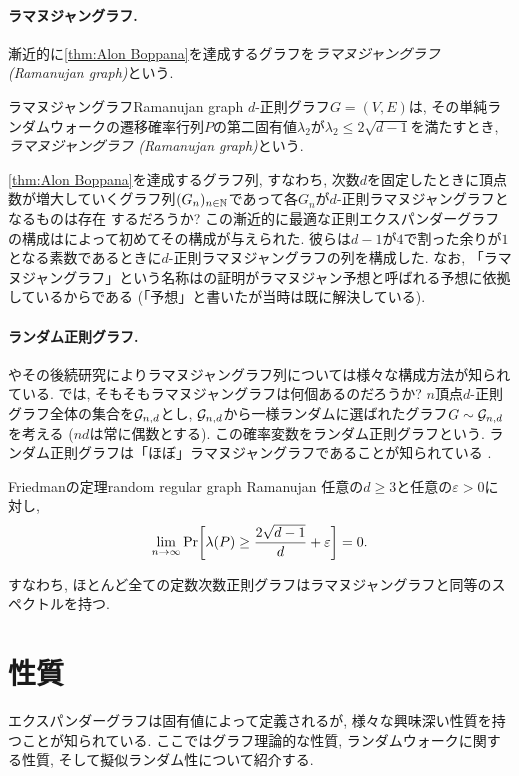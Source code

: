 \paragraph*{ラマヌジャングラフ.}
漸近的に\cref{thm:Alon Boppana}を達成するグラフを\emph{ラマヌジャングラフ (Ramanujan graph)}という.
\begin{definition}{ラマヌジャングラフ}{Ramanujan graph}
    $d$-正則グラフ$G=(V,E)$は, その単純ランダムウォークの遷移確率行列$P$の第二固有値$\lambda_2$が$\lambda_2 \le 2\sqrt{d-1}$を満たすとき, \emph{ラマヌジャングラフ (Ramanujan graph)}という.
\end{definition}

\cref{thm:Alon Boppana}を達成するグラフ列, すなわち,
次数$d$を固定したときに頂点数が増大していくグラフ列$(G_n)_{n\in\mathbb{N}}$であって各$G_n$が$d$-正則ラマヌジャングラフとなるものは存在
するだろうか?
この漸近的に最適な正則エクスパンダーグラフの構成は\citet{LPS88}によって初めてその構成が与えられた.
彼らは$d-1$が$4$で割った余りが$1$となる素数であるときに$d$-正則ラマヌジャングラフの列を構成した.
なお, 「ラマヌジャングラフ」という名称は\cite{LPS88}の証明がラマヌジャン予想と呼ばれる予想に依拠しているからである
(「予想」と書いたが当時は既に解決している).

\paragraph*{ランダム正則グラフ.}
\citet{LPS88}やその後続研究によりラマヌジャングラフ列については様々な構成方法が知られている.
では, そもそもラマヌジャングラフは何個あるのだろうか?
$n$頂点$d$-正則グラフ全体の集合を$\mathcal{G}_{n,d}$とし,
$\mathcal{G}_{n,d}$から一様ランダムに選ばれたグラフ$G\sim\mathcal{G}_{n,d}$を考える
($nd$は常に偶数とする).
この確率変数をランダム正則グラフという.
ランダム正則グラフは「ほぼ」ラマヌジャングラフであることが知られている
\cite{Friedman_random_regular}.
\begin{theorem}{Friedmanの定理}{random regular graph Ramanujan}
    任意の$d\ge 3$と任意の$\varepsilon > 0$に対し,
    \[ \lim_{n\to\infty}\Pr\sbra*{\lambda(P) \ge \frac{2\sqrt{d-1}}{d} + \varepsilon} = 0. \]
\end{theorem}
すなわち, ほとんど全ての定数次数正則グラフはラマヌジャングラフと同等のスペクトルを持つ.

\section{性質}
エクスパンダーグラフは固有値によって定義されるが, 様々な興味深い性質を持つことが知られている.
ここではグラフ理論的な性質, ランダムウォークに関する性質, そして擬似ランダム性について紹介する.
%
